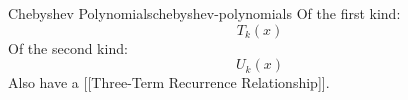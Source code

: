 \begin{definition}{Chebyshev Polynomials}{chebyshev-polynomials}
  Of the first kind: $$T_k(x)$$ Of the second kind: $$U_k(x)$$ Also have a
  {[}{[}Three-Term Recurrence Relationship{]}{]}.
\end{definition}
